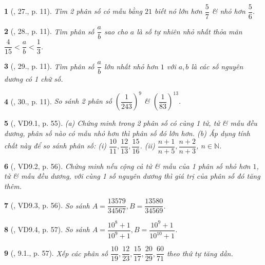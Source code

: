 \documentclass{article}
\newtheorem{baitoan}{}
\begin{document}
\begin{baitoan}[\cite{Binh_Toan_6_tap_2}, 27., p. 11]
	Tìm 2 phân số có mẫu bằng $21$ biết nó lớn hơn $\dfrac{5}{7}$ \& nhỏ hơn $\dfrac{5}{6}$.
\end{baitoan}

\begin{baitoan}[\cite{Binh_Toan_6_tap_2}, 28., p. 11]
	Tìm phân số $\dfrac{a}{b}$ sao cho $a$ là số tự nhiên nhỏ nhất thỏa mãn $\dfrac{4}{15} < \dfrac{a}{b} < \dfrac{1}{3}$.
\end{baitoan}

\begin{baitoan}[\cite{Binh_Toan_6_tap_2}, 29., p. 11]
	Tìm phân số $\dfrac{a}{b}$ lớn nhất nhỏ hơn $1$ với $a,b$ là các số nguyên dương có 1 chữ số.
\end{baitoan}

\begin{baitoan}[\cite{Binh_Toan_6_tap_2}, 30., p. 11]
	So sánh 2 phân số $\left(\dfrac{1}{243}\right)^9$ \& $\left(\dfrac{1}{83}\right)^{13}$.
\end{baitoan}

\begin{baitoan}[\cite{TLCT_THCS_Toan_6_so_hoc}, VD9.1, p. 55]
	(a) Chứng minh trong 2 phân số có cùng 1 tử, tử \& mẫu đều dương, phân số nào có mẫu nhỏ hơn thì phân số đó lớn hơn. (b) Áp dụng tính chất này để so sánh phân số: (i) $\dfrac{10}{11},\dfrac{12}{13},\dfrac{15}{16}$. (ii) $\dfrac{n + 1}{n + 5},\dfrac{n + 2}{n + 3}$, $n\in\mathbb{N}$.
\end{baitoan}

\begin{baitoan}[\cite{TLCT_THCS_Toan_6_so_hoc}, VD9.2, p. 56]
	Chứng minh nếu cộng cả tử \& mẫu của 1 phân số nhỏ hơn $1$, tử \& mẫu đều dương, với cùng 1 số nguyên dương thì giá trị của phân số đó tăng thêm.
\end{baitoan}

\begin{baitoan}[\cite{TLCT_THCS_Toan_6_so_hoc}, VD9.3, p. 56]
	So sánh $A = \dfrac{13579}{34567},B = \dfrac{13580}{34569}$.
\end{baitoan}

\begin{baitoan}[\cite{TLCT_THCS_Toan_6_so_hoc}, VD9.4, p. 57]
	So sánh $A = \dfrac{10^8 + 1}{10^9 + 1},B = \dfrac{10^9 + 1}{10^{10} + 1}$.
\end{baitoan}

\begin{baitoan}[\cite{TLCT_THCS_Toan_6_so_hoc}, 9.1., p. 57]
	Xếp các phân số $\dfrac{10}{19},\dfrac{12}{23},\dfrac{15}{17},\dfrac{20}{29},\dfrac{60}{71}$ theo thứ tự tăng dần.
\end{baitoan}
\end{document}
